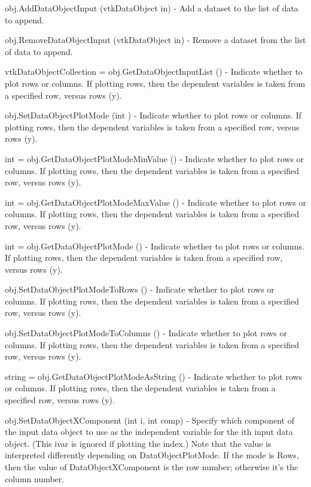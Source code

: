 \begin{DoxyItemize}
\item {\ttfamily obj.\-Add\-Data\-Object\-Input (vtk\-Data\-Object in)} -\/ Add a dataset to the list of data to append.  
\item {\ttfamily obj.\-Remove\-Data\-Object\-Input (vtk\-Data\-Object in)} -\/ Remove a dataset from the list of data to append.  
\item {\ttfamily vtk\-Data\-Object\-Collection = obj.\-Get\-Data\-Object\-Input\-List ()} -\/ Indicate whether to plot rows or columns. If plotting rows, then the dependent variables is taken from a specified row, versus rows (y).  
\item {\ttfamily obj.\-Set\-Data\-Object\-Plot\-Mode (int )} -\/ Indicate whether to plot rows or columns. If plotting rows, then the dependent variables is taken from a specified row, versus rows (y).  
\item {\ttfamily int = obj.\-Get\-Data\-Object\-Plot\-Mode\-Min\-Value ()} -\/ Indicate whether to plot rows or columns. If plotting rows, then the dependent variables is taken from a specified row, versus rows (y).  
\item {\ttfamily int = obj.\-Get\-Data\-Object\-Plot\-Mode\-Max\-Value ()} -\/ Indicate whether to plot rows or columns. If plotting rows, then the dependent variables is taken from a specified row, versus rows (y).  
\item {\ttfamily int = obj.\-Get\-Data\-Object\-Plot\-Mode ()} -\/ Indicate whether to plot rows or columns. If plotting rows, then the dependent variables is taken from a specified row, versus rows (y).  
\item {\ttfamily obj.\-Set\-Data\-Object\-Plot\-Mode\-To\-Rows ()} -\/ Indicate whether to plot rows or columns. If plotting rows, then the dependent variables is taken from a specified row, versus rows (y).  
\item {\ttfamily obj.\-Set\-Data\-Object\-Plot\-Mode\-To\-Columns ()} -\/ Indicate whether to plot rows or columns. If plotting rows, then the dependent variables is taken from a specified row, versus rows (y).  
\item {\ttfamily string = obj.\-Get\-Data\-Object\-Plot\-Mode\-As\-String ()} -\/ Indicate whether to plot rows or columns. If plotting rows, then the dependent variables is taken from a specified row, versus rows (y).  
\item {\ttfamily obj.\-Set\-Data\-Object\-X\-Component (int i, int comp)} -\/ Specify which component of the input data object to use as the independent variable for the ith input data object. (This ivar is ignored if plotting the index.) Note that the value is interpreted differently depending on Data\-Object\-Plot\-Mode. If the mode is Rows, then the value of Data\-Object\-X\-Component is the row number; otherwise it's the column number.  

\end{DoxyItemize}
